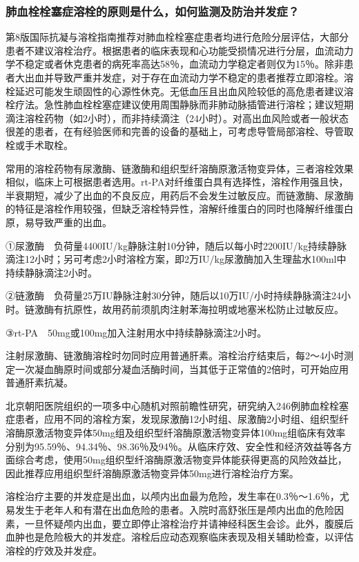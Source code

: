 \subsubsection{肺血栓栓塞症溶栓的原则是什么，如何监测及防治并发症？}

第8版国际抗凝与溶栓指南推荐对肺血栓栓塞症患者均进行危险分层评估，大部分患者不建议溶栓治疗。根据患者的临床表现和心功能受损情况进行分层，血流动力学不稳定或者休克患者的病死率高达58％，血流动力学稳定者则仅为15％。除非患者大出血并导致严重并发症，对于存在血流动力学不稳定的患者推荐立即溶栓。溶栓延迟可能发生顽固性的心源性休克。无低血压且出血风险较低的高危患者建议溶栓疗法。急性肺血栓栓塞症建议使用周围静脉而非肺动脉插管进行溶栓；建议短期滴注溶栓药物（如2小时），而非持续滴注（24小时）。对高出血风险或者一般状态很差的患者，在有经验医师和完善的设备的基础上，可考虑导管局部溶栓、导管取栓或手术取栓。

常用的溶栓药物有尿激酶、链激酶和组织型纤溶酶原激活物变异体，三者溶栓效果相似，临床上可根据患者选用。rt-PA对纤维蛋白具有选择性，溶栓作用强且快，半衰期短，减少了出血的不良反应，用药后不会发生过敏反应。而链激酶、尿激酶的特征是溶栓作用较强，但缺乏溶栓特异性，溶解纤维蛋白的同时也降解纤维蛋白原，易导致严重的出血。

①尿激酶　负荷量4400IU/kg静脉注射10分钟，随后以每小时2200IU/kg持续静脉滴注12小时；另可考虑2小时溶栓方案，即2万IU/kg尿激酶加入生理盐水100ml中持续静脉滴注2小时。

②链激酶　负荷量25万IU静脉注射30分钟，随后以10万IU/小时持续静脉滴注24小时。链激酶有抗原性，故用药前须肌肉注射苯海拉明或地塞米松防止过敏反应。

③rt-PA　50mg或100mg加入注射用水中持续静脉滴注2小时。

注射尿激酶、链激酶溶栓时勿同时应用普通肝素。溶栓治疗结束后，每2～4小时测定一次凝血酶原时间或部分凝血活酶时间，当其低于正常值的2倍时，可开始应用普通肝素抗凝。

北京朝阳医院组织的一项多中心随机对照前瞻性研究，研究纳入246例肺血栓栓塞症患者，应用不同的溶栓方案，发现尿激酶12小时组、尿激酶2小时组、组织型纤溶酶原激活物变异体50mg组及组织型纤溶酶原激活物变异体100mg组临床有效率分别为95.59％、94.34％、98.36％及94％。从临床疗效、安全性和经济效益等各方面综合考虑，使用50mg组织型纤溶酶原激活物变异体能获得更高的风险效益比，因此推荐应用组织型纤溶酶原激活物变异体50mg进行溶栓治疗方案。

溶栓治疗主要的并发症是出血，以颅内出血最为危险，发生率在0.3％～1.6％，尤易发生于老年人和有潜在出血危险的患者。入院时高舒张压是颅内出血的危险因素，一旦怀疑颅内出血，要立即停止溶栓治疗并请神经科医生会诊。此外，腹膜后血肿也是危险极大的并发症。溶栓后应动态观察临床表现及相关辅助检查，以评估溶栓的疗效及并发症。

